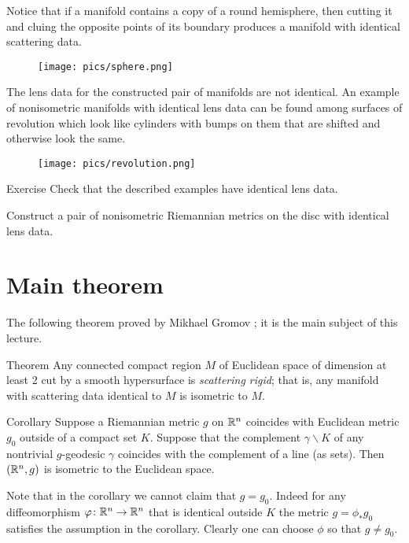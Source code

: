 Notice that if a manifold contains a copy of a round hemisphere, then cutting it and cluing the opposite points of its boundary produces a manifold with identical scattering data.
\begin{figure}[h!]
\centering
\texttt{[image: pics/sphere.png]}
\end{figure}
The lens data for the constructed pair of manifolds are not identical.
An example of nonisometric manifolds with identical lens data can be found among surfaces of revolution which look like cylinders with bumps on them that are shifted and otherwise look the same.
\begin{figure}[h!]
\centering
\texttt{[image: pics/revolution.png]}
\end{figure}

\begin{thm}{Exercise}
Check that the described examples have identical lens data.

Construct a pair of nonisometric Riemannian metrics on the disc with identical lens data.
\end{thm}

\section{Main theorem}

The following theorem proved by Mikhael Gromov \cite{gromov-1983};
it is the main subject of this lecture.

\begin{thm}{Theorem}\label{thm:magic-cloak}
Any connected compact region $M$ of Euclidean space of dimension at least 2 cut by a smooth hypersurface is \emph{scattering rigid};
that is, any manifold with scattering data identical to $M$ is isometric to $M$.
\end{thm}

\begin{thm}{Corollary}
Suppose a Riemannian metric $g$ on $\mathbb{R}^n$ coincides with Euclidean metric $g_0$ outside of a compact set $K$.
Suppose that the complement $\gamma\backslash K$ of any nontrivial $g$-geodesic $\gamma$ coincides with the complement of a line (as sets).
Then $(\mathbb{R}^n,g)$ is isometric to the Euclidean space.
\end{thm}

Note that in the corollary we cannot claim that $g=g_0$.
Indeed for any diffeomorphism $\varphi\colon\mathbb{R}^n\to\mathbb{R}^n$ that is identical outside $K$ the metric $g=\phi_*g_0$ satisfies the assumption in the corollary.
Clearly one can choose $\phi$ so that $g\ne g_0$.


